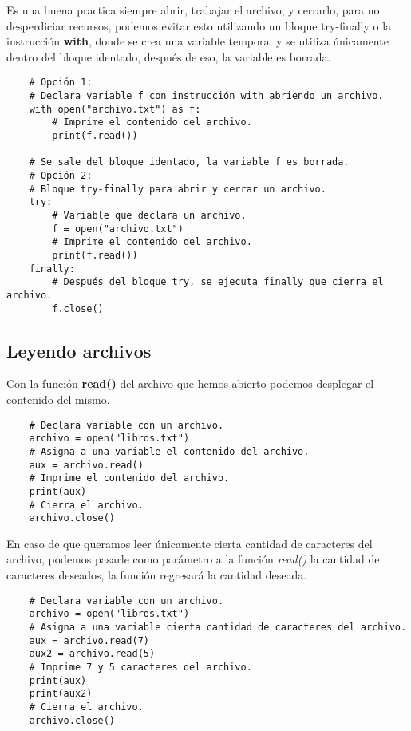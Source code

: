 Es una buena practica siempre abrir, trabajar el archivo, y cerrarlo, para no desperdiciar recursos, podemos evitar esto utilizando un bloque try-finally o la instrucción \textbf{with}, donde se crea una variable temporal y se utiliza únicamente dentro del bloque identado, después de eso, la variable es borrada.
\begin{lstlisting}
    # Opción 1:
    # Declara variable f con instrucción with abriendo un archivo.
    with open("archivo.txt") as f:
        # Imprime el contenido del archivo.
        print(f.read())
      
    # Se sale del bloque identado, la variable f es borrada.
    # Opción 2:
    # Bloque try-finally para abrir y cerrar un archivo.
    try:
        # Variable que declara un archivo.
        f = open("archivo.txt")
        # Imprime el contenido del archivo.
        print(f.read())
    finally:
        # Después del bloque try, se ejecuta finally que cierra el archivo.
        f.close()
\end{lstlisting}


\subsection{Leyendo archivos}

Con la función \textbf{read()} del archivo que hemos abierto podemos desplegar el contenido del mismo.
\begin{lstlisting}
    # Declara variable con un archivo.
    archivo = open("libros.txt")
    # Asigna a una variable el contenido del archivo.
    aux = archivo.read()
    # Imprime el contenido del archivo.
    print(aux)
    # Cierra el archivo.
    archivo.close()
\end{lstlisting}

En caso de que queramos leer únicamente cierta cantidad de caracteres del archivo, podemos pasarle como parámetro a la función \textit{read()} la cantidad de caracteres deseados, la función regresará la cantidad deseada.
\begin{lstlisting}
    # Declara variable con un archivo.
    archivo = open("libros.txt")
    # Asigna a una variable cierta cantidad de caracteres del archivo.
    aux = archivo.read(7)
    aux2 = archivo.read(5)
    # Imprime 7 y 5 caracteres del archivo.
    print(aux)
    print(aux2)
    # Cierra el archivo.
    archivo.close()
\end{lstlisting}

